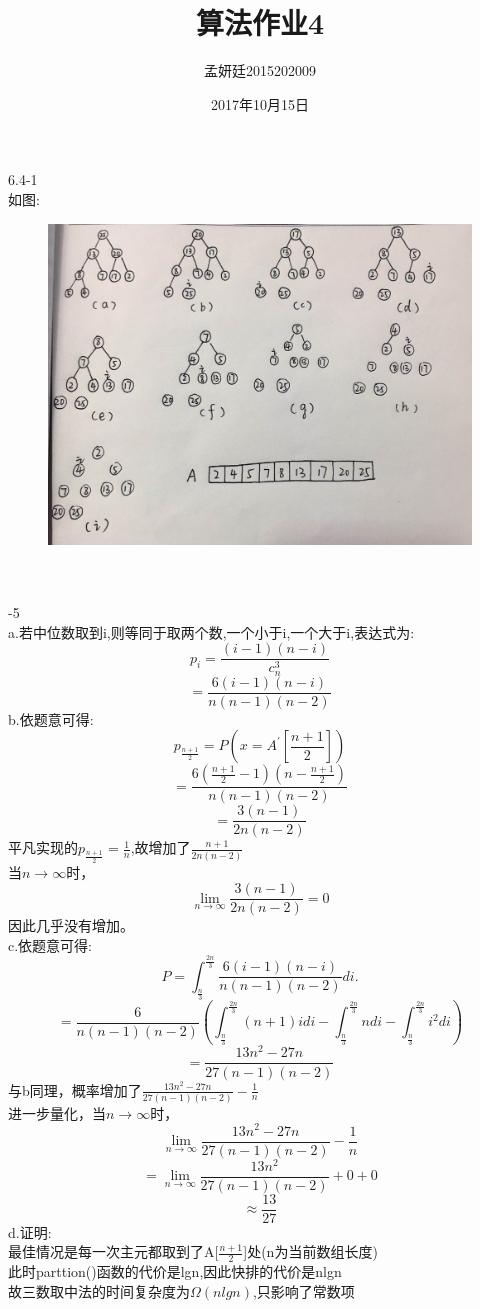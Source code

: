 \documentclass[19pt,a4paper]{article}
\title{算法作业4}
\author{孟妍廷2015202009}
\date{2017年10月15日}
\begin{document}
\maketitle

6.4-1\\
\indent 如图:
\begin{figure}[htbp]
 \centering
 \includegraphics[scale=0.3]{1.jpeg}
\end{figure}\\
\\
-5\\
\indent a.若中位数取到i,则等同于取两个数,一个小于i,一个大于i,表达式为:\\
$$p_i=\frac{(i-1)(n-i)}{c_n^3}$$
$$=\frac{6(i-1)(n-i)}{n(n-1)(n-2)}$$
\indent b.依题意可得:\\
$$p_{\frac{n+1}{2}}=P(x=A^\prime[\frac{n+1}{2}])$$
$$=\frac{6(\frac{n+1}{2}-1)(n-\frac{n+1}{2})}{n(n-1)(n-2)}$$
$$=\frac{3(n-1)}{2n(n-2)}$$
\indent 平凡实现的$p_{\frac{n+1}{2}}=\frac{1}{n}$,故增加了$\frac{n+1}{2n(n-2)}$\\
\indent 当$n\rightarrow\infty$时，\\
$$\lim_{n\to\infty}\frac{3(n-1)}{2n(n-2)}=0$$
\indent 因此几乎没有增加。\\
\indent c.依题意可得:\\
$$P=\int_{\frac{n}{3}}^{\frac{2n}{3}}  \frac{6(i-1)(n-i)}{n(n-1)(n-2)} di.$$
$$=\frac{6}{n(n-1)(n-2)}(\int_{\frac{n}{3}}^{\frac{2n}{3}}(n+1)idi-\int_{\frac{n}{3}}^{\frac{2n}{3}}ndi-\int_{\frac{n}{3}}^{\frac{2n}{3}}i^2di)$$
$$=\frac{13n^2-27n}{27(n-1)(n-2)}$$
\indent 与b同理，概率增加了$\frac{13n^2-27n}{27(n-1)(n-2)}-\frac{1}{n}$\\
\indent 进一步量化，当$n\rightarrow\infty$时，\\
$$\lim_{n\to\infty}\frac{13n^2-27n}{27(n-1)(n-2)}-\frac{1}{n}$$
$$=\lim_{n\to\infty}\frac{13n^2}{27(n-1)(n-2)}+0+0$$
$$\approx \frac{13}{27}$$
\indent d.证明:\\
\indent 最佳情况是每一次主元都取到了A[$\frac{n+1}{2}$]处(n为当前数组长度)\\
\indent 此时parttion()函数的代价是lgn,因此快排的代价是nlgn\\
\indent 故三数取中法的时间复杂度为$\Omega(nlgn)$,只影响了常数项\\
\end{document}
